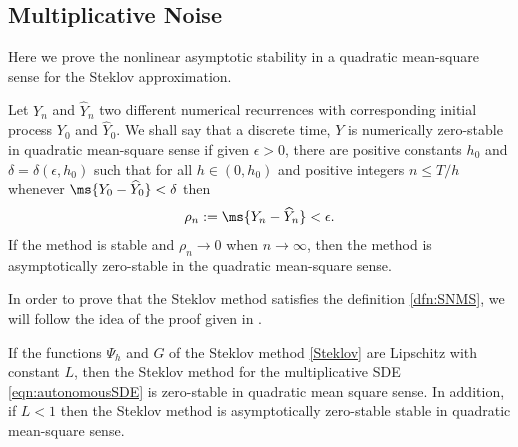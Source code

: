     \subsection{Multiplicative Noise}
    Here  we prove the nonlinear asymptotic stability in a quadratic mean-square sense
    for the Steklov approximation.
    \begin{dfn}\label{dfn:SNMS}\cite{Baker2000a}
      Let $Y_n$ and $\widehat{Y}_n$ two different numerical recurrences  with
      corresponding initial process  $Y_0$ and $\widehat{Y}_0$. We shall say that a
      discrete time, $Y$ is numerically zero-stable in quadratic mean-square sense if given
      $\epsilon >0$, there  are positive constants $h_0$ and $\delta=\delta(\epsilon,h_0)$
      such that for all $h\in(0,h_0)$ and positive integers $n \leq T/h$ whenever
      $\ms{Y_0-\widehat{Y}_0}<\delta$ then
      \begin {eqnarray}\label{eqn:SNMS}
	\rho_n :=
	\ms{Y_n-\widehat{Y}_{n}}<\epsilon .
      \end{eqnarray}
      If the method is stable and $\rho_n \to 0$ when $n\to \infty$, then the method is
      asymptotically zero-stable in the quadratic mean-square sense.
    \end{dfn}
    In order to prove that the Steklov method satisfies the definition
    \ref{dfn:SNMS}, we will follow the idea of the proof given in
    \cite[Th.4]{Baker2000a}.
    \begin{thm}
      If the functions $\Psi_h$ and $G$ of the Steklov method \eqref{Steklov} are
      Lipschitz with constant $L$, then the Steklov method for the multiplicative SDE 
      \eqref{eqn:autonomousSDE} is zero-stable in quadratic mean square sense.
       In addition, if $L<1$ then the Steklov method is asymptotically zero-stable stable in quadratic 
       mean-square sense.
    \end{thm}
